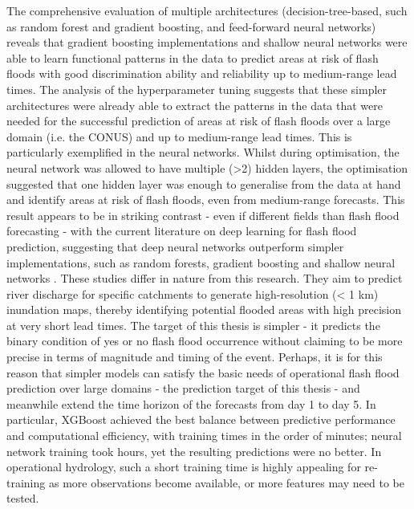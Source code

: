 The comprehensive evaluation of multiple architectures (decision-tree-based, such as random forest and gradient boosting, and feed-forward neural networks) reveals that gradient boosting implementations and shallow neural networks were able to learn functional patterns in the data to predict areas at risk of flash floods with good discrimination ability and reliability up to medium-range lead times. The analysis of the hyperparameter tuning suggests that these simpler architectures were already able to extract the patterns in the data that were needed for the successful prediction of areas at risk of flash floods over a large domain (i.e. the CONUS) and up to medium-range lead times. This is particularly exemplified in the neural networks. Whilst during optimisation, the neural network was allowed to have multiple (>2) hidden layers, the optimisation suggested that one hidden layer was enough to generalise from the data at hand and identify areas at risk of flash floods, even from medium-range forecasts. This result appears to be in striking contrast - even if different fields than flash flood forecasting - with the current literature on deep learning for flash flood prediction, suggesting that deep neural networks outperform simpler implementations, such as random forests, gradient boosting and shallow neural networks \citep{Roy_2020, Kumari_2021}. These studies differ in nature from this research. They aim to predict river discharge for specific catchments to generate high-resolution (< 1 km) inundation maps, thereby identifying potential flooded areas with high precision at very short lead times. The target of this thesis is simpler - it predicts the binary condition of yes or no flash flood occurrence without claiming to be more precise in terms of magnitude and timing of the event. Perhaps, it is for this reason that simpler models can satisfy the basic needs of operational flash flood prediction over large domains \citep{Zanchetta_2020} - the prediction target of this thesis - and meanwhile extend the time horizon of the forecasts from day 1 to day 5. In particular, XGBoost achieved the best balance between predictive performance and computational efficiency, with training times in the order of minutes; neural network training took hours, yet the resulting predictions were no better. In operational hydrology, such a short training time is highly appealing for re-training as more observations become available, or more features may need to be tested. 

